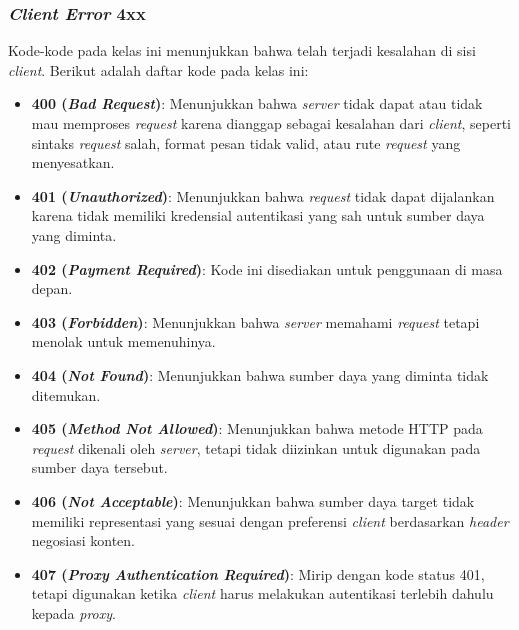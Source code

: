 \subsubsection{\textit{Client Error} 4xx}
\label{subsubsec:020104-client-error-4xx}

Kode-kode pada kelas ini menunjukkan bahwa telah terjadi kesalahan di sisi \textit{client}. Berikut adalah daftar kode pada kelas ini:

\begin{itemize}
    \item \textbf{400 (\textit{Bad Request})}: Menunjukkan bahwa \textit{server} tidak dapat atau tidak mau memproses \textit{request} karena dianggap sebagai kesalahan dari \textit{client}, seperti sintaks \textit{request} salah, format pesan tidak valid, atau rute \textit{request} yang menyesatkan.
  
    \item \textbf{401 (\textit{Unauthorized})}: Menunjukkan bahwa \textit{request} tidak dapat dijalankan karena tidak memiliki kredensial autentikasi yang sah untuk sumber daya yang diminta.
  
    \item \textbf{402 (\textit{Payment Required})}: Kode ini disediakan untuk penggunaan di masa depan.
  
    \item \textbf{403 (\textit{Forbidden})}: Menunjukkan bahwa \textit{server} memahami \textit{request} tetapi menolak untuk memenuhinya.
  
    \item \textbf{404 (\textit{Not Found})}: Menunjukkan bahwa sumber daya yang diminta tidak ditemukan.
  
    \item \textbf{405 (\textit{Method Not Allowed})}: Menunjukkan bahwa metode HTTP pada \textit{request} dikenali oleh \textit{server}, tetapi tidak diizinkan untuk digunakan pada sumber daya tersebut.
  
    \item \textbf{406 (\textit{Not Acceptable})}: Menunjukkan bahwa sumber daya target tidak memiliki representasi yang sesuai dengan preferensi \textit{client} berdasarkan \textit{header} negosiasi konten.
  
    \item \textbf{407 (\textit{Proxy Authentication Required})}: Mirip dengan kode status 401, tetapi digunakan ketika \textit{client} harus melakukan autentikasi terlebih dahulu kepada \textit{proxy}.
  

\end{itemize}

